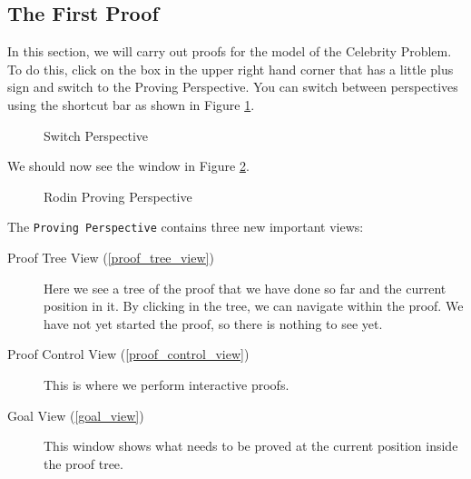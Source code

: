 \subsection{The First Proof}
\label{tut_first_proof}

In this section, we will carry out proofs for the model of the Celebrity Problem. To do this, click on the box in the upper right hand corner that has a little plus sign and switch to the Proving Perspective. You can switch between perspectives using the shortcut bar as shown in Figure \ref{fig_tut_08_switch_perspective}. 

\begin{figure}[!ht]
\begin{center}
	\caption{Switch Perspective}
	\label{fig_tut_08_switch_perspective}
\end{center}
\end{figure}


We should now see the window in Figure \ref{fig_tut_08_proving_perspective}. 

\begin{figure}[!ht]
\begin{center}
	\caption{Rodin Proving Perspective}
	\label{fig_tut_08_proving_perspective}
\end{center}
\end{figure}

The \texttt{Proving Perspective} contains three new important views:

\begin{description}
	\item[Proof Tree View (\ref{proof_tree_view})] Here we see a tree of the proof that we have done so far and the current position in it. By clicking in the tree, we can navigate within the proof. We have not yet started the proof, so there is nothing to see yet.
	\item[Proof Control View (\ref{proof_control_view})] This is where we perform interactive proofs.
	\item[Goal View (\ref{goal_view})] This window shows what needs to be proved at the current position inside the proof tree.
\end{description}

